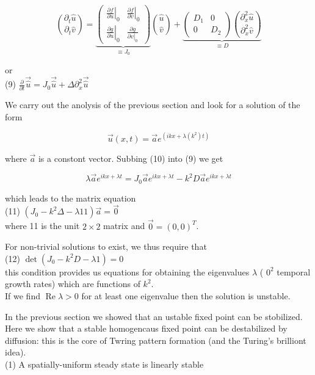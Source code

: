 \documentclass[10pt]{article}
\begin{document}
$$
\binom{\partial_{t} \hat{u}}{\partial_{t} \hat{v}}=\underbrace{\left(\begin{array}{cc}
\left.\frac{\partial f}{\partial u}\right|_{0} & \left.\frac{\partial f}{\partial v}\right|_{0} \\
\left.\frac{\partial g}{\partial u}\right|_{0} & \frac{\partial g}{\left.\partial v\right|_{0}}
\end{array}\right)}_{\equiv J_{0}}\binom{\hat{u}}{\hat{v}}+\underbrace{\left(\begin{array}{cc}
D_{1} & 0 \\
0 & D_{2}
\end{array}\right)\binom{\partial_{x}^{2} \hat{u}}{\partial_{x}^{2} \hat{v}}}_{\equiv D}
$$

or\\
(9) $\frac{\partial}{\partial t} \overrightarrow{\hat{u}}=J_{0} \overrightarrow{\hat{u}}+\Delta \partial_{x}^{2} \overrightarrow{\hat{u}}$

We carry out the anolysis of the previous section and look for a solution of the form


\begin{equation*}
\vec{u}(x, t)=\vec{a} e^{\left(i k x+\lambda\left(k^{2}\right) t\right)} \tag{10}
\end{equation*}


where $\vec{a}$ is a constont vector. Subbing (10) into (9) we get

$$
\lambda \vec{a} e^{i k x+\lambda t}=J_{0} \vec{a} e^{i k x+\lambda t}-k^{2} D \vec{a} e^{i k x+\lambda t}
$$

which leads to the matrix equation\\
(11) $\left(J_{0}-k^{2} \Delta-\lambda 11\right) \vec{a}=\overrightarrow{0}$\\
where 11 is the unit $2 \times 2$ matrix and $\overrightarrow{0}=(0,0)^{T}$.

For non-trivial solutions to exist, we thus require that\\
(12) $\operatorname{det}\left(J_{0}-k^{2} D-\lambda 1\right)=0$\\
this condition provides us equations for obtaining the eigenvalues $\lambda$ ( $0^{2}$ temporal growth rates) which are functions of $k^{2}$.\\
If we find $\operatorname{Re} \lambda>0$ for at least one eigenvalue then the solution is unstable.

In the previous section we showed that an ustable fixed point can be stobilized. Here we show that a stable homogencaus fixed point can be destabilized by diffusion: this is the core of Twring pattern formation (and the Turing's brilliont idea).\\
(1) A spatially-uniform steady state is linearly stable
\end{document}
